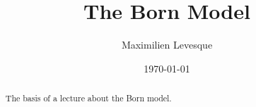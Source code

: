 \documentclass[aps,prl,preprint,groupedaddress]{revtex4-1}
\begin{document}

\title{The Born Model}


\author{Maximilien Levesque}


\date{\today}

\begin{abstract}
The basis of a lecture about the Born model.
\end{abstract}

\pacs{}

\maketitle

\end{document}
